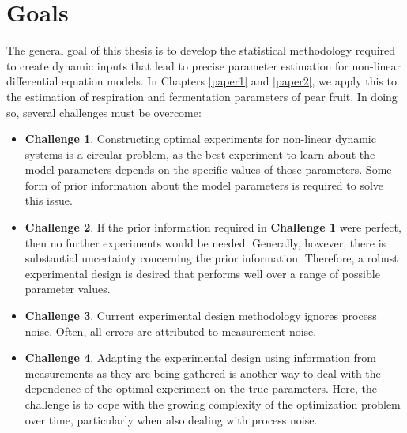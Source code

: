 \section{Goals}
The general goal of this thesis is to develop the statistical methodology required to create dynamic inputs that lead to precise parameter estimation for non-linear differential equation models. In Chapters \ref{paper1} and \ref{paper2}, we apply this to the estimation of respiration and fermentation parameters of pear fruit. In doing so, several challenges  must be overcome:
\begin{itemize}
	\item \textbf{Challenge 1}. Constructing optimal experiments for non-linear dynamic systems is a circular problem, as the best experiment to learn about the model parameters depends on the specific values of those parameters. Some form of prior information about the model parameters is required to solve this issue.
	\item \textbf{Challenge 2}. If the prior information required in \textbf{Challenge 1} were perfect, then no further experiments would be needed. Generally, however, there is substantial uncertainty concerning the prior information. Therefore, a robust experimental design is desired that performs well over a range of possible parameter values.
	\item \textbf{Challenge 3}. Current experimental design methodology ignores process noise. Often, all errors are attributed to measurement noise. 
	\item \textbf{Challenge 4}. Adapting the experimental design using information from measurements as they are being gathered is another way to deal with the dependence of the optimal experiment on the true parameters. Here, the challenge is to cope with the growing complexity of the optimization problem over time, particularly when also dealing with process noise.
\end{itemize}
\pagebreak

